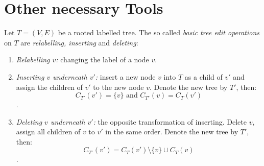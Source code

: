 \section{Other necessary Tools}
\begin{defin}
Let $T=(V,E)$ be a rooted labelled tree. The so called \textit{basic tree edit operations} on $T$ are \textit{relabelling, inserting} and \textit{deleting}: 
\begin{enumerate}
\item \textit{Relabelling $v$:} changing the label of a node $v$.
\item \textit{Inserting $v$ underneath $v'$: } insert a new node $v$ into $T$ as a child of $v'$ and assign the children of $v'$ to the new node $v$. Denote the new tree by $T'$, then: 
$$C_{T'}(v') = \{v\}\text{ and }C_{T'}(v) = C_T(v')$$.
\item \textit{Deleting $v$ underneath $v'$: } the opposite transformation of inserting. Delete $v$, assign all children of $v$ to $v'$ in the same order. Denote the new tree by $T'$, then: 
$$C_{T'}(v') = C_T(v')\setminus \{v\} \cup C_T(v)$$.
\end{enumerate}
\end{defin}
